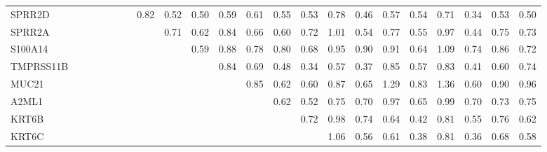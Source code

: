 \begin{longtable}{lrrrrrrrrrrrrrrrrrrrrr}
SPRR2D    &            &           &              &             &              &              &         0.82 &          0.52 &            0.50 &        0.59 &        0.61 &        0.55 &        0.53 &        0.78 &       0.46 &       0.57 &        0.54 &        0.71 &        0.34 &       0.53 &       0.50 \\
SPRR2A    &            &           &              &             &              &              &              &          0.71 &            0.62 &        0.84 &        0.66 &        0.60 &        0.72 &        1.01 &       0.54 &       0.77 &        0.55 &        0.97 &        0.44 &       0.75 &       0.73 \\
S100A14   &            &           &              &             &              &              &              &               &            0.59 &        0.88 &        0.78 &        0.80 &        0.68 &        0.95 &       0.90 &       0.91 &        0.64 &        1.09 &        0.74 &       0.86 &       0.72 \\
TMPRSS11B &            &           &              &             &              &              &              &               &                 &        0.84 &        0.69 &        0.48 &        0.34 &        0.57 &       0.37 &       0.85 &        0.57 &        0.83 &        0.41 &       0.60 &       0.74 \\
MUC21     &            &           &              &             &              &              &              &               &                 &             &        0.85 &        0.62 &        0.60 &        0.87 &       0.65 &       1.29 &        0.83 &        1.36 &        0.60 &       0.90 &       0.96 \\
A2ML1     &            &           &              &             &              &              &              &               &                 &             &             &        0.62 &        0.52 &        0.75 &       0.70 &       0.97 &        0.65 &        0.99 &        0.70 &       0.73 &       0.75 \\
KRT6B     &            &           &              &             &              &              &              &               &                 &             &             &             &        0.72 &        0.98 &       0.74 &       0.64 &        0.42 &        0.81 &        0.55 &       0.76 &       0.62 \\
KRT6C     &            &           &              &             &              &              &              &               &                 &             &             &             &             &        1.06 &       0.56 &       0.61 &        0.38 &        0.81 &        0.36 &       0.68 &       0.58 \\

\end{longtable}
